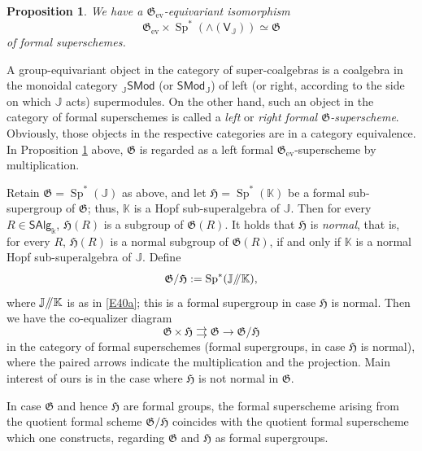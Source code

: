 \documentclass[11pt, a4paper]{amsart}
\newtheorem{prop}[theorem]{Proposition}
\theoremstyle{definition}
\numberwithin{equation}{section}
\begin{document}
\begin{prop}\label{PA1}
We have a $\mathfrak{G}_{\operatorname{ev}}$-equivariant isomorphism 
\[
\mathfrak{G}_{\operatorname{ev}}\times \operatorname{Sp}^*(\wedge(\mathsf{V}_{\mathbb{J}}))\simeq \mathfrak{G}
\]
of formal superschemes. 
\end{prop}

A group-equivariant object in the category of super-coalgebras is a coalgebra in the monoidal 
category ${}_{\mathbb{J}}\mathsf{SMod}$ (or $\mathsf{SMod}_{\mathbb{J}}$) of left (or right, according to the side on which $\mathbb{J}$ acts)
supermodules. On the other hand, such an object in the category of formal superschemes is called a 
\emph{left} or \emph{right formal $\mathfrak{G}$-superscheme}. Obviously, those objects in the respective categories 
are in a category equivalence. In Proposition \ref{PA1} above, $\mathfrak{G}$ is regarded as a left 
formal $\mathfrak{G}_{\operatorname{ev}}$-superscheme by multiplication. 

Retain
$\mathfrak{G}=\operatorname{Sp}^*(\mathbb{J})$ 
as above, and let $\mathfrak{H}=\operatorname{Sp}^*(\mathbb{K})$
be a formal sub-supergroup of $\mathfrak{G}$; 
thus, $\mathbb{K}$ is a Hopf sub-superalgebra of $\mathbb{J}$. 
Then for every $R \in \mathsf{SAlg}_{\Bbbk}$,
$\mathfrak{H}(R)$ is a subgroup of $\mathfrak{G}(R)$. It holds that $\mathfrak{H}$ is \emph{normal}, 
that is, for every $R$, $\mathfrak{H}(R)$ is a normal subgroup of $\mathfrak{G}(R)$, if and only if $\mathbb{K}$ is 
a normal Hopf sub-superalgebra of $\mathbb{J}$. 
Define
\[
\mathfrak{G}/\mathfrak{H}:=\operatorname{Sp}^*(\mathbb{J}/\hspace{-1mm}/\mathbb{K}), 
\]
where $\mathbb{J}/\hspace{-1mm}/\mathbb{K}$ is as in \eqref{E40a}; this is a formal supergroup
in case $\mathfrak{H}$ is normal. Then we have the co-equalizer diagram
\[
\mathfrak{G}\times \mathfrak{H}\rightrightarrows\mathfrak{G}\to \mathfrak{G}/\mathfrak{H}
\]
in the category of formal superschemes (formal supergroups, in case $\mathfrak{H}$ is normal), 
where the paired arrows indicate the multiplication and the projection. Main interest of ours is in the case where
$\mathfrak{H}$ is not normal in $\mathfrak{G}$. 

In case $\mathfrak{G}$ and hence $\mathfrak{H}$ are formal groups, the formal superscheme 
arising from the quotient formal scheme $\mathfrak{G}/\mathfrak{H}$ coincides with the 
quotient formal superscheme which one constructs, 
regarding $\mathfrak{G}$ and $\mathfrak{H}$ as formal supergroups. 
\end{document}
